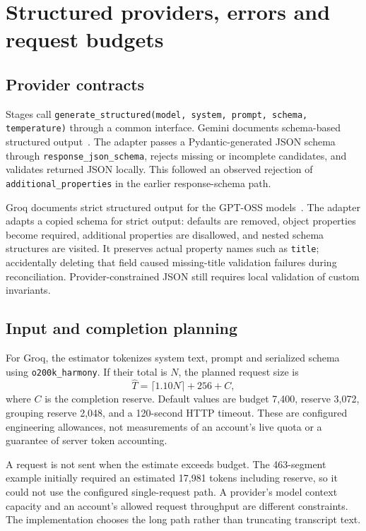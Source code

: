 \documentclass[11pt,a4paper]{article}
\newcommand{\code}[1]{\nolinkurl{#1}}
\begin{document}
\section{Structured providers, errors and request budgets}
\subsection{Provider contracts}
Stages call \code{generate_structured(model, system, prompt, schema, temperature)} through a common interface. Gemini documents schema-based structured output~\cite{gemini}. The adapter passes a Pydantic-generated JSON schema through \code{response_json_schema}, rejects missing or incomplete candidates, and validates returned JSON locally. This followed an observed rejection of \code{additional_properties} in the earlier response-schema path.

Groq documents strict structured output for the GPT-OSS models~\cite{groq}. The adapter adapts a copied schema for strict output: defaults are removed, object properties become required, additional properties are disallowed, and nested schema structures are visited. It preserves actual property names such as \code{title}; accidentally deleting that field caused missing-title validation failures during reconciliation. Provider-constrained JSON still requires local validation of custom invariants.

\subsection{Input and completion planning}
For Groq, the estimator tokenizes system text, prompt and serialized schema using \code{o200k_harmony}. If their total is $N$, the planned request size is
\[
\widehat{T}=\lceil 1.10N\rceil+256+C,
\]
where $C$ is the completion reserve. Default values are budget 7,400, reserve 3,072, grouping reserve 2,048, and a 120-second HTTP timeout. These are configured engineering allowances, not measurements of an account's live quota or a guarantee of server token accounting.

A request is not sent when the estimate exceeds budget. The 463-segment example initially required an estimated 17,981 tokens including reserve, so it could not use the configured single-request path. A provider's model context capacity and an account's allowed request throughput are different constraints. The implementation chooses the long path rather than truncating transcript text.
\end{document}
